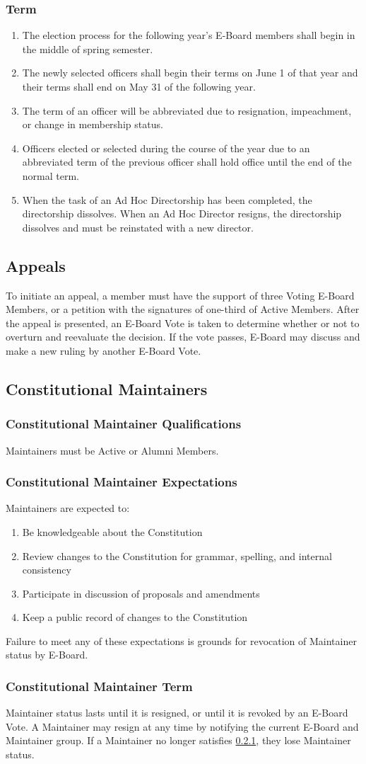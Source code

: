 \documentclass{article}
\newcommand{\asection}[1]{\subsection{#1} \label{#1}}
\newcommand{\asubsection}[1]{\subsubsection{#1} \label{#1}}
\begin{document}
\asubsection{Term}
\begin{enumerate}
	\item The election process for the following year's E-Board members shall begin in the middle of spring semester.
	\item The newly selected officers shall begin their terms on June 1 of that year and their terms shall end on May 31 of the following year.
	\item The term of an officer will be abbreviated due to resignation, impeachment, or change in membership status.
	\item Officers elected or selected during the course of the year due to an abbreviated term of the previous officer shall hold office until the end of the normal term.
	\item When the task of an Ad Hoc Directorship has been completed, the directorship dissolves.
	      When an Ad Hoc Director resigns, the directorship dissolves and must be reinstated with a new director.
\end{enumerate}

\asection{Appeals}
To initiate an appeal, a member must have the support of three Voting E-Board Members, or a petition with the signatures of one-third of Active Members.
After the appeal is presented, an E-Board Vote is taken to determine whether or not to overturn and reevaluate the decision.
If the vote passes, E-Board may discuss and make a new ruling by another E-Board Vote.

\asection{Constitutional Maintainers}

\asubsection{Constitutional Maintainer Qualifications}
Maintainers must be Active or Alumni Members.

\asubsection{Constitutional Maintainer Expectations}
Maintainers are expected to:
\begin{enumerate}
	\item Be knowledgeable about the Constitution
	\item Review changes to the Constitution for grammar, spelling, and internal consistency
	\item Participate in discussion of proposals and amendments
	\item Keep a public record of changes to the Constitution
\end{enumerate}
Failure to meet any of these expectations is grounds for revocation of Maintainer status by E-Board.

\asubsection{Constitutional Maintainer Term}
Maintainer status lasts until it is resigned, or until it is revoked by an E-Board Vote.
A Maintainer may resign at any time by notifying the current E-Board and Maintainer group.
If a Maintainer no longer satisfies \ref{Constitutional Maintainer Qualifications}, they lose Maintainer status.
\end{document}
